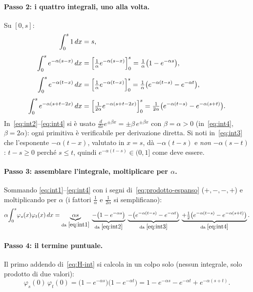 \documentclass[11pt,a4paper]{article}
\theoremstyle{plain}
\theoremstyle{definition}
\theoremstyle{remark}
\begin{document}
\paragraph{Passo 2: i quattro integrali, uno alla volta.} Su $[0,s]$:
\begin{align}
  \int_0^s 1\,dx &= s, \label{eq:int1}\\[4pt]
  \int_0^s e^{-\alpha(s-x)}\,dx
  &= \Bigl[\tfrac{1}{\alpha}e^{-\alpha(s-x)}\Bigr]_0^s
   = \tfrac{1}{\alpha}\bigl(1-e^{-\alpha s}\bigr), \label{eq:int2}\\[4pt]
  \int_0^s e^{-\alpha(t-x)}\,dx
  &= \Bigl[\tfrac{1}{\alpha}e^{-\alpha(t-x)}\Bigr]_0^s
   = \tfrac{1}{\alpha}\bigl(e^{-\alpha(t-s)}-e^{-\alpha t}\bigr), \label{eq:int3}\\[4pt]
  \int_0^s e^{-\alpha(s+t-2x)}\,dx
  &= \Bigl[\tfrac{1}{2\alpha}e^{-\alpha(s+t-2x)}\Bigr]_0^s
   = \tfrac{1}{2\alpha}\bigl(e^{-\alpha(t-s)}-e^{-\alpha(s+t)}\bigr). \label{eq:int4}
\end{align}
In~\eqref{eq:int2}--\eqref{eq:int4} si è usato $\frac{d}{dx}e^{\pm\beta x}=\pm\beta\,e^{\pm\beta x}$
con $\beta=\alpha>0$ (in~\eqref{eq:int4}, $\beta=2\alpha$): ogni primitiva è verificabile per
derivazione diretta. Si noti in~\eqref{eq:int3} che l'esponente $-\alpha(t-x)$, valutato in
$x=s$, dà $-\alpha(t-s)$ e \emph{non} $-\alpha(s-t)$: $t-s\ge 0$ perché $s\le t$, quindi
$e^{-\alpha(t-s)}\in(0,1]$ come deve essere.

\paragraph{Passo 3: assemblare l'integrale, moltiplicare per $\alpha$.} Sommando
\eqref{eq:int1}--\eqref{eq:int4} con i segni di~\eqref{eq:prodotto-espanso}
($+,-,-,+$) e moltiplicando per $\alpha$ (i fattori $\tfrac1\alpha$ e $\tfrac1{2\alpha}$ si
semplificano):
\begin{equation}
  \alpha\!\int_0^{s}\!\varphi_s(x)\varphi_t(x)\,dx
  = \underbrace{\alpha s}_{\text{da }\eqref{eq:int1}}
    \;\underbrace{-\bigl(1-e^{-\alpha s}\bigr)}_{\text{da }\eqref{eq:int2}}
    \;\underbrace{-\bigl(e^{-\alpha(t-s)}-e^{-\alpha t}\bigr)}_{\text{da }\eqref{eq:int3}}
    \;\underbrace{+\tfrac12\bigl(e^{-\alpha(t-s)}-e^{-\alpha(s+t)}\bigr)}_{\text{da }\eqref{eq:int4}} .
  \label{eq:somma-integrale}
\end{equation}

\paragraph{Passo 4: il termine puntuale.} Il primo addendo di~\eqref{eq:H-int} si calcola in
un colpo solo (nessun integrale, solo prodotto di due valori):
\begin{equation}
  \varphi_s(0)\,\varphi_t(0)
  = \bigl(1-e^{-\alpha s}\bigr)\bigl(1-e^{-\alpha t}\bigr)
  = 1 - e^{-\alpha s} - e^{-\alpha t} + e^{-\alpha(s+t)} .
  \label{eq:punto}
\end{equation}
\end{document}
